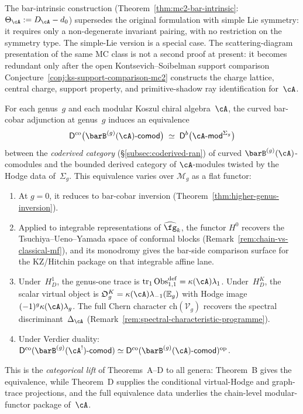 \begin{remark}[Scope]
The bar-intrinsic construction
(Theorem~\ref{thm:mc2-bar-intrinsic}: $\Theta_\cA := D_\cA - d_0$)
supersedes the original formulation with simple Lie symmetry: it
requires only a non-degenerate invariant pairing, with no restriction
on the symmetry type. The simple-Lie version is a special case.
The scattering-diagram presentation of the same MC class is not a
second proof at present: it becomes redundant only after the open
Kontsevich--Soibelman support comparison
Conjecture~\ref{conj:ks-support-comparison-mc2} constructs the charge
lattice, central charge, support property, and primitive-shadow ray
identification for~$\cA$.
\end{remark}

\begin{conjecture}%
\label{conj:categorical-modular-kd}%
%
For each genus~$g$ and each modular Koszul chiral
algebra~$\cA$, the curved bar-cobar adjunction at genus~$g$
induces an equivalence
\[
\mathsf{D}^{\mathrm{co}}
\bigl(\barB^{(g)}(\cA)\text{-}\mathsf{comod}\bigr)
\;\simeq\;
\mathsf{D}^b\bigl(\cA\text{-}\mathsf{mod}^{\Sigma_g}\bigr)
\]
between the \emph{coderived category}
\textup{(}\S\textup{\ref{subsec:coderived-ran})} of curved
$\barB^{(g)}(\cA)$-comodules and the bounded derived category of
$\cA$-modules twisted by the Hodge data of~$\Sigma_g$.
This equivalence varies over $\mathcal{M}_g$ as a flat functor:
\begin{enumerate}[label=\textup{(\roman*)}]
\item At $g = 0$, it reduces to bar-cobar inversion
 \textup{(}Theorem~\textup{\ref{thm:higher-genus-inversion})}.
\item Applied to integrable representations of
 $\widehat{\fg}_k$, the functor $H^0$ recovers the
 Tsuchiya--Ueno--Yamada space of conformal blocks
 \textup{(}Remark~\textup{\ref{rem:chain-vs-classical-mf})},
 and its monodromy gives the bar-side comparison surface for
 the KZ/Hitchin package on that
 integrable affine lane.
\item Under~$H_D^1$, the genus-one trace is
 $\operatorname{tr}_1\operatorname{Obs}^{\mathrm{def}}_{1,1}
 =\kappa(\cA)\lambda_1$.  Under~$H_D^K$, the scalar virtual object is
 $\mathfrak O_g^K=\kappa(\cA)\lambda_{-1}(\mathbb E_g)$ with Hodge
 image $(-1)^g\kappa(\cA)\lambda_g$.
 The full Chern character
 $\mathrm{ch}(\mathcal{V}_g)$
 recovers the spectral discriminant~$\Delta_{\cA}$
 \textup{(}Remark~\textup{\ref{rem:spectral-characteristic-programme})}.
\item Under Verdier duality:
 $\mathsf{D}^{\mathrm{co}}(\barB^{(g)}(\cA^!)\text{-}\mathsf{comod})
 \simeq
 \mathsf{D}^{\mathrm{co}}(\barB^{(g)}(\cA)\text{-}\mathsf{comod})^{\mathrm{op}}$.
\end{enumerate}
This is the \emph{categorical lift} of
Theorems~A--D to all genera: Theorem~B
gives the equivalence, while Theorem~D supplies the conditional
virtual-Hodge and graph-trace projections,
and the full equivalence data underlies the chain-level
modular-functor package of~$\cA$.
\end{conjecture}

